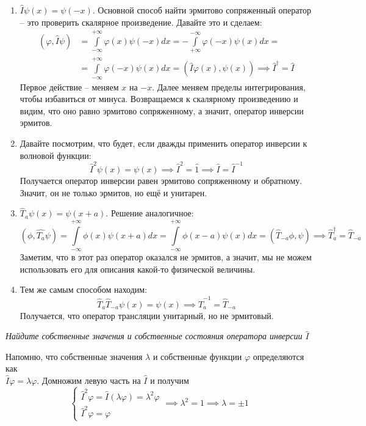 \begin{enumerate}
\item $\hat I \psi(x) = \psi(-x)$. Основной способ найти эрмитово сопряженный оператор -- это проверить скалярное произведение. Давайте это и сделаем:
\begin{align*}
    (\varphi, \hat{I}\psi)  &= \int\limits^{+\infty}_{-\infty} \varphi(x) \psi(-x) dx = -\int\limits^{-\infty}_{+\infty} \varphi(-x) \psi(x) dx = \\ 
    &= \int\limits^{+\infty}_{-\infty}\varphi(-x) \psi(x) dx = (\hat{I}\varphi(x), \psi(x)) \implies \hat I^{\dagger} = \hat I
\end{align*}
Первое действие -- меняем $x$ на $-x$. Далее меняем пределы интегрирования, чтобы избавиться от минуса. Возвращаемся к скалярному произведению и видим, что оно равно эрмитово сопряженному, а значит, оператор инверсии эрмитов.

\item Давайте посмотрим, что будет, если дважды применить оператор инверсии к волновой функции:
\[
\hat I^2 \psi(x) = \psi(x) \implies \hat I^2 = \hat 1 \implies \hat{I} = \hat{I}^{-1}
\]
Получается оператор инверсии равен эрмитово сопряженному и обратному. Значит, он не только эрмитов, но ещё и унитарен.

\item $\hat T_a \psi(x) = \psi(x+a)$. Решение аналогичное:
\[
(\phi, \hat{T_a} \psi) = \int\limits^{+\infty}_{-\infty} \phi(x)\psi(x+a) dx = \int\limits^{+\infty}_{-\infty} \phi(x-a) \psi(x)dx = (\hat{T}_{-a}\phi, \psi) \implies \hat T^{\dagger}_a = \hat T_{-a} 
\]
Заметим, что в этот раз оператор оказался не эрмитов, а значит, мы не можем использовать его для описания какой-то физической величины.

\item Тем же самым способом находим:
\[
\hat T_a \hat T_{-a} \psi(x) = \psi(x) \implies \hat T_a^{-1} = \hat T_{-a}
\]
Получается, что оператор трансляции унитарный, но не эрмитовый.
\end{enumerate}
\newpage
{}
\begin{center}
\textit{Найдите собственные значения и собственные состояния оператора инверсии $\hat I$}
\end{center}
Напомню, что собственные значения $\lambda$ и собственные функции $\varphi$ определяются как \\
$\hat I \varphi = \lambda \varphi$. Домножим левую часть на $\hat I$ и получим
\[
\begin{cases}
\hat I^2 \varphi = \hat I(\lambda \varphi) = \lambda^2 \varphi \\
\hat I^2 \varphi = \varphi
\end{cases}
\implies \lambda^2 = 1 \implies \lambda = \pm 1
\]

